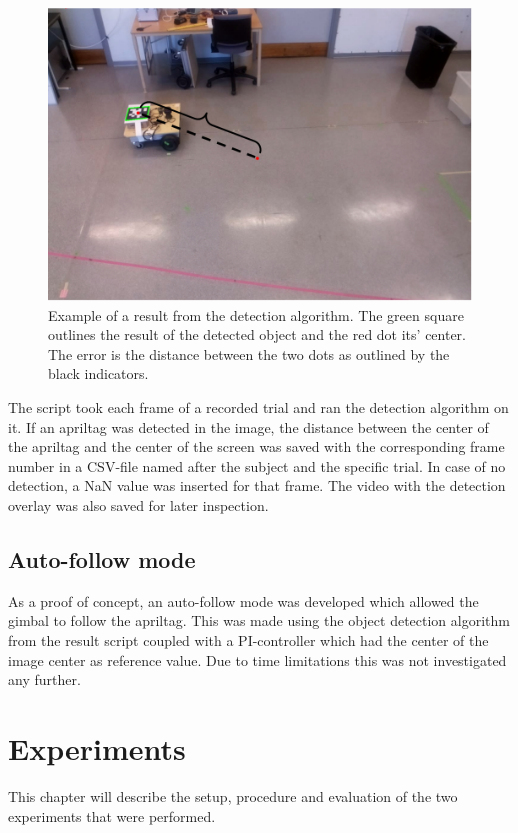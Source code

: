 \documentclass[nofilelist]{cslthse-msc}
\begin{document}
\begin{figure}[!hbt]
   \centering
   \includegraphics[scale=0.3]{images/resultcalc.png} 
   \caption{Example of a result from the detection algorithm. The green square outlines the result of the detected object and the red dot its' center. The error is the distance between the two dots as outlined by the black indicators.}
   \label{fig:resultcalc}
\end{figure}

The script took each frame of a recorded trial and ran the detection algorithm on it. If an apriltag was detected in the image, the distance between the center of the apriltag and the center of the screen was saved with the corresponding frame number in a CSV-file named after the subject and the specific trial. In case of no detection, a NaN value was inserted for that frame. The video with the detection overlay was also saved for later inspection.

\section{Auto-follow mode}
As a proof of concept, an auto-follow mode was developed which allowed the gimbal to follow the apriltag. This was made using the object detection algorithm from the result script coupled with a PI-controller which had the center of the image center as reference value. Due to time limitations this was not investigated any further.

\chapter{Experiments}
This chapter will describe the setup, procedure and evaluation of the two experiments that were performed.
\end{document}

